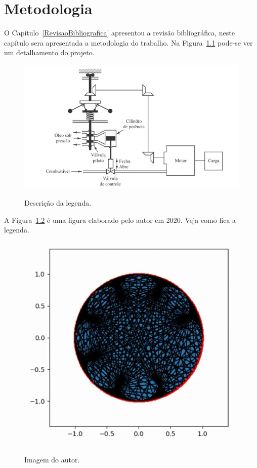 \chapter{Metodologia} \label{metodologia}

O Capítulo~\ref{RevisaoBibliografica} apresentou a revisão bibliográfica, neste capítulo sera apresentada a metodologia do trabalho. Na Figura~\ref{fig:quadro} pode-se ver um detalhamento do projeto.

\begin{figure}[ht] %
    \begin{center}
    \caption{Descrição da legenda.} %
    \label{fig:quadro}
    \includegraphics[width=0.9\linewidth]{Figuras/imagem1.JPG} \\
    \end{center}
\end{figure}

A Figura~\ref{fig:icone} é uma figura elaborado pelo autor em 2020. Veja como fica a legenda.

\begin{figure}[H] %
    \begin{center}
    \caption{Imagem do autor.} %
    \label{fig:icone}
    \includegraphics[width=0.5\linewidth]{Figuras/imagem2.jpg} \\
    \end{center}
    \fonteautor
    
\end{figure}


